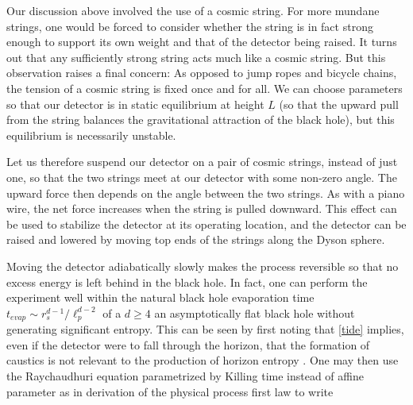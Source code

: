 \documentclass[12pt]{article}
\begin{document}
Our discussion above involved the use of a cosmic string. For more mundane strings, one would be forced to consider whether the string is in fact strong enough to support its own weight and that of the detector being raised.    It turns out \cite{AB} that any sufficiently strong string acts much like a cosmic string.  But this observation raises a final concern:  As opposed to jump ropes and bicycle chains, the tension of a cosmic string is fixed once and for all.   We can choose parameters so that our detector is in static equilibrium at height $L$ (so that the upward pull from the string balances the gravitational attraction of the black hole), but this equilibrium is necessarily unstable.

Let us therefore suspend our detector on a pair of cosmic strings, instead of just one, so that the two strings meet at our detector with some non-zero angle.  The upward force then depends on the angle between the two strings.  As with a piano wire, the net force increases when the string is pulled downward.  This effect can be used to stabilize the detector at its operating location, and the detector can be raised and lowered by moving top ends of the strings along the Dyson sphere.

Moving the detector adiabatically slowly makes the process reversible so that no excess energy is left behind in the black hole.   In fact, one can perform the experiment well within the natural black hole evaporation time $t_{evap} \sim r_s^{d-1}/\ell_p^{d-2}$ of a $d \ge 4$ an asymptotically flat black hole without generating significant entropy.  This can be seen by first noting that \eqref{tide} implies, even if the detector were to fall through the horizon, that the formation of caustics is not relevant to the production of horizon entropy \cite{membrane,Amsel:2007mh}.  One may then use the Raychaudhuri equation parametrized by Killing time instead of affine parameter as in derivation of the physical process first law \cite{firstlaw} to write
\end{document}
